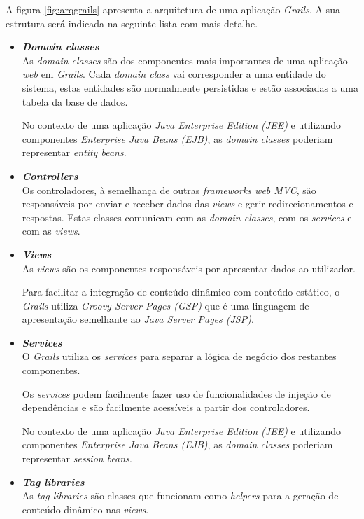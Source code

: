 \hspace{1cm}

A figura \ref{fig:arqgrails} apresenta a arquitetura de uma aplicação \textit{Grails}. A sua estrutura será indicada na seguinte lista com mais detalhe.

\begin{itemize}
    \item \textbf{\textit{Domain classes}}\\

    As \textit{domain classes} são dos componentes mais importantes de uma aplicação \textit{web} em \textit{Grails}. Cada \textit{domain class} vai corresponder a uma entidade do sistema, estas entidades são normalmente persistidas e estão associadas a uma tabela da base de dados.

    No contexto de uma aplicação \textit{Java Enterprise Edition (JEE)} e utilizando componentes \textit{Enterprise Java Beans (EJB)}, as \textit{domain classes} poderiam representar \textit{entity beans}. 

    \item \textbf{\textit{Controllers}}\\

    Os controladores, à semelhança de outras \textit{frameworks web MVC}, são responsáveis por enviar e receber dados das \textit{views} e gerir redirecionamentos e respostas. Estas classes comunicam com as \textit{domain classes}, com os \textit{services} e com as \textit{views}.

    \item \textbf{\textit{Views}}\\

    As \textit{views} são os componentes responsáveis por apresentar dados ao utilizador.

    Para facilitar a integração de conteúdo dinâmico com conteúdo estático, o \textit{Grails} utiliza \textit{Groovy Server Pages (GSP)} que é uma linguagem de apresentação semelhante ao \textit{Java Server Pages (JSP)}.

    \item \textbf{\textit{Services}}\\

    O \textit{Grails} utiliza os \textit{services} para separar a lógica de negócio dos restantes componentes.

    Os \textit{services} podem facilmente fazer uso de funcionalidades de injeção de dependências e são facilmente acessíveis a partir dos controladores.

    No contexto de uma aplicação \textit{Java Enterprise Edition (JEE)} e utilizando componentes \textit{Enterprise Java Beans (EJB)}, as \textit{domain classes} poderiam representar \textit{session beans}.  

    \item \textbf{\textit{Tag libraries}}\\

    As \textit{tag libraries} são classes que funcionam como \textit{helpers} para a geração de conteúdo dinâmico nas \textit{views}.

\end{itemize}

